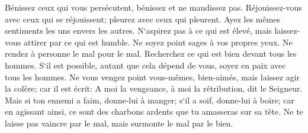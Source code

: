 \verse Bénissez ceux qui vous persécutent, bénissez et ne maudissez pas. 
\verse Réjouissez-vous avec ceux qui se réjouissent; pleurez avec ceux qui pleurent. 
\verse Ayez les mêmes sentiments les uns envers les autres. N`aspirez pas à ce qui est élevé, mais laissez-vous attirer par ce qui est humble. Ne soyez point sages à vos propres yeux. 
\verse Ne rendez à personne le mal pour le mal. Recherchez ce qui est bien devant tous les hommes. 
\verse S`il est possible, autant que cela dépend de vous, soyez en paix avec tous les hommes. 
\verse Ne vous vengez point vous-mêmes, bien-aimés, mais laissez agir la colère; car il est écrit: A moi la vengeance, à moi la rétribution, dit le Seigneur. 
\verse Mais si ton ennemi a faim, donne-lui à manger; s`il a soif, donne-lui à boire; car en agissant ainsi, ce sont des charbons ardents que tu amasseras sur sa tête. 
\verse Ne te laisse pas vaincre par le mal, mais surmonte le mal par le bien. 

